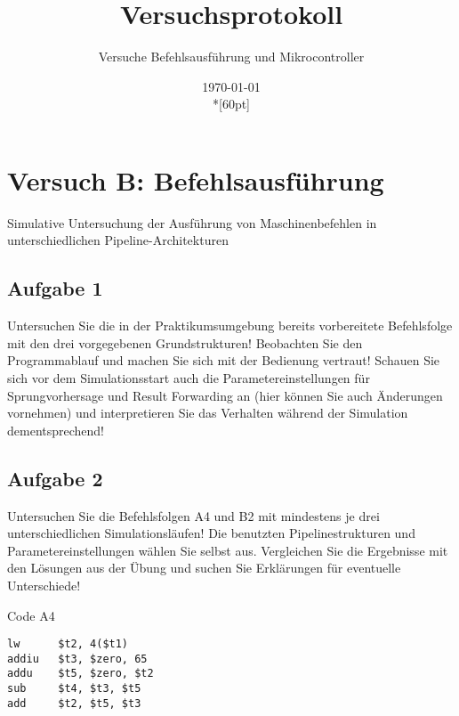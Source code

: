 \documentclass[a4paper,12pt,titlepage]{scrartcl}
\begin{document}
\titlehead
{
    \small
    {
        Technische Universität Ilmenau\\
        Fakulät IA\\
        Fachgebiet Rechnerarchitektur\\

        Praktikum Rechnerarchitektur 2\\
        WS 2021/22}
}

\title {Versuchsprotokoll}
\subtitle{Versuche Befehlsausführung und Mikrocontroller}
\author{}
\date{\today\\*[60pt]}
\maketitle  %

\pagestyle{fancy}
\newpage

\section*{Versuch B: Befehlsausführung}
Simulative Untersuchung der Ausführung von Maschinenbefehlen in unterschiedlichen Pipeline-Architekturen

\subsection*{Aufgabe 1}
Untersuchen Sie die in der Praktikumsumgebung bereits vorbereitete Befehlsfolge mit den drei vorgegebenen Grundstrukturen! Beobachten Sie den Programmablauf und machen Sie sich mit der Bedienung vertraut! Schauen Sie sich vor dem Simulationsstart auch die Parametereinstellungen für Sprungvorhersage und Result Forwarding an (hier können Sie auch Änderungen vornehmen) und interpretieren Sie das Verhalten während der Simulation dementsprechend!

\subsection*{Aufgabe 2}
Untersuchen Sie die Befehlsfolgen A4 und B2 mit mindestens je drei unterschiedlichen Simulationsläufen! Die benutzten Pipelinestrukturen und Parametereinstellungen wählen Sie selbst aus. Vergleichen Sie die Ergebnisse mit den Lösungen aus der Übung und suchen Sie Erklärungen für eventuelle Unterschiede!

Code A4
\begin{lstlisting}[basicstyle=\tiny]
lw      $t2, 4($t1)
addiu   $t3, $zero, 65
addu    $t5, $zero, $t2
sub     $t4, $t3, $t5
add     $t2, $t5, $t3
\end{lstlisting}
\end{document}
